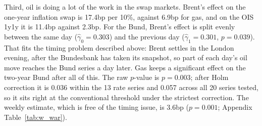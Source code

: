 \documentclass[11pt,a4paper]{article}
\begin{document}
Third, oil is doing a lot of the work in the swap markets. Brent's effect on the one-year inflation swap is
17.4bp per 10\%, against 6.9bp for gas, and on the OIS 1y1y it is 11.4bp against 2.3bp.
For the Bund, Brent's effect is split evenly between the same day ($\hat\gamma_0=0.303$) and the previous day
($\hat\gamma_1=0.301$, $p=0.039$). That fits the timing problem described above: Brent settles in the London
evening, after the Bundesbank has taken its snapshot, so part of each day's oil move reaches the Bund series a day later. Gas keeps a
significant effect on the two-year Bund after all of this. The raw $p$-value is $p=0.003$; after Holm correction
it is 0.036 within the 13 rate series and 0.057 across all 20 series tested, so it sits right at the
conventional threshold under the strictest correction. The weekly estimate, which is free of the timing issue, is
3.6bp ($p=0.001$; Appendix Table~\ref{tab:w_war}).
\end{document}
